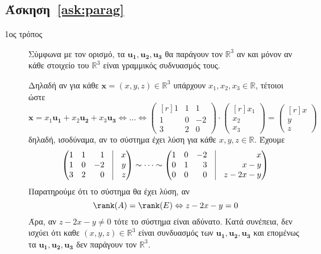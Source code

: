 \documentclass[a4paper,table]{report}
\begin{document}
\subsection*{Άσκηση~\ref{ask:parag}} 

\begin{description}
  \item[1ος τρόπος] 
    Σύμφωνα με τον ορισμό, τα $ \mathbf{u_{1}}, \mathbf{u_{2}}, \mathbf{u_{3}} $ θα 
    παράγουν τον $ \mathbb{R}^{3} $ αν και μόνον αν \textcolor{Col1}{κάθε} στοιχείο του 
    $ \mathbb{R}^{3} $ είναι γραμμικός συδνυασμός τους.

    Δηλαδή αν για κάθε $ \mathbf{x} = (x,y,z) \in \mathbb{R}^{3} $  υπάρχουν 
    $ x_{1}, x_{2}, x_{3} \in \mathbb{R} $, τέτοιοι ώστε
    \[
      \mathbf{x} = x_{1} \mathbf{u_{1}}+ x_{2} \mathbf{u_{2}}+ x_{3} \mathbf{u_{3}}
      \Leftrightarrow \ldots \Leftrightarrow 
      \begin{pmatrix*}[r]
        1 & 1 & 1 \\
        1 & 0 & -2 \\
        3 & 2 & 0
      \end{pmatrix*} \cdot 
      \begin{pmatrix*}[r] x_{1} \\ x_{2} \\ x_{3} \end{pmatrix*} = 
      \begin{pmatrix*}[r] x \\ y \\ z \end{pmatrix*}
    \] 
    δηλαδή, ισοδύναμα, αν το σύστημα έχει λύση για \textcolor{Col1}{κάθε} 
    $x,y,z \in \mathbb{R}$. Έχουμε
    \[
      \begin{pmatrix*}[r]
        1 & 1 & 1 & \vrule & x \\
        1 & 0 & -2 & \vrule & y \\
        3 & 2 & 0 & \vrule & z
      \end{pmatrix*} \sim \cdots \sim 
      \begin{pmatrix*}[r]
        1 & 0 & -2 & \vrule & x \\
        0 & 1 & 3 & \vrule & x - y \\
        0 & 0 & 0 & \vrule & z - 2x -y 
      \end{pmatrix*}
    \] 
    Παρατηρούμε ότι το σύστημα θα έχει λύση, αν
    \[
      \rank(A) = \rank(E) \Leftrightarrow z-2x-y=0
    \] 
    Άρα, αν $ z-2x-y \neq 0 $ τότε το σύστημα είναι αδύνατο. Κατά συνέπεια, δεν ισχύει 
    ότι καθε $ (x,y,z) \in \mathbb{R}^{3} $ είναι συνδυασμός των $ \mathbf{u_{1}},
    \mathbf{u_{2}}, \mathbf{u_{3}} $ και επομένως τα $ \mathbf{u_{1}}, \mathbf{u_{2}},
    \mathbf{u_{3}} $ δεν παράγουν τον $ \mathbb{R}^{3} $.


\end{description}
\end{document}
